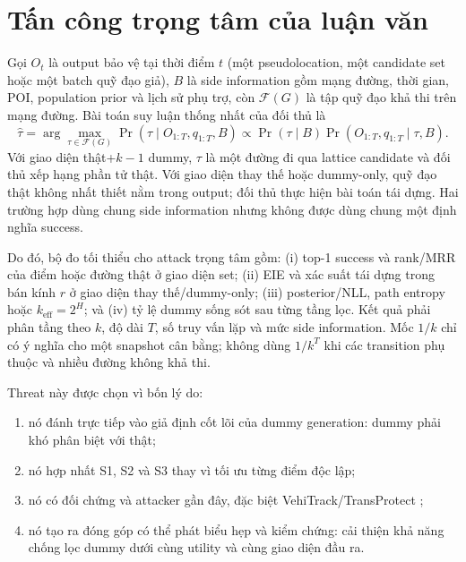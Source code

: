 \documentclass[12pt,a4paper,oneside]{report}
\begin{document}
\section{Tấn công trọng tâm của luận văn}

\begin{center}
\end{center}

Gọi $O_t$ là output bảo vệ tại thời điểm $t$ (một pseudolocation, một candidate set hoặc một batch quỹ đạo giả), $B$ là side information gồm mạng đường, thời gian, POI, population prior và lịch sử phụ trợ, còn $\mathcal F(G)$ là tập quỹ đạo khả thi trên mạng đường. Bài toán suy luận thống nhất của đối thủ là
\[
\widehat{\tau}
=\arg\max_{\tau\in\mathcal F(G)}
\Pr(\tau\mid O_{1:T},q_{1:T},B)
\propto
\Pr(\tau\mid B)\Pr(O_{1:T},q_{1:T}\mid\tau,B).
\]
Với giao diện thật+$k-1$ dummy, $\tau$ là một đường đi qua lattice candidate và đối thủ xếp hạng phần tử thật. Với giao diện thay thế hoặc dummy-only, quỹ đạo thật không nhất thiết nằm trong output; đối thủ thực hiện bài toán tái dựng. Hai trường hợp dùng chung side information nhưng không được dùng chung một định nghĩa success.

Do đó, bộ đo tối thiểu cho attack trọng tâm gồm: (i) top-1 success và rank/MRR của điểm hoặc đường thật ở giao diện set; (ii) EIE và xác suất tái dựng trong bán kính $r$ ở giao diện thay thế/dummy-only; (iii) posterior/NLL, path entropy hoặc $k_{\mathrm{eff}}=2^H$; và (iv) tỷ lệ dummy sống sót sau từng tầng lọc. Kết quả phải phân tầng theo $k$, độ dài $T$, số truy vấn lặp và mức side information. Mốc $1/k$ chỉ có ý nghĩa cho một snapshot cân bằng; không dùng $1/k^T$ khi các transition phụ thuộc và nhiều đường không khả thi.

Threat này được chọn vì bốn lý do:

\begin{enumerate}
  \item nó đánh trực tiếp vào giả định cốt lõi của dummy generation: dummy phải khó phân biệt với thật;
  \item nó hợp nhất S1, S2 và S3 thay vì tối ưu từng điểm độc lập;
  \item nó có đối chứng và attacker gần đây, đặc biệt VehiTrack/TransProtect \citep{yadav2024transprotect};
  \item nó tạo ra đóng góp có thể phát biểu hẹp và kiểm chứng: cải thiện khả năng chống lọc dummy dưới cùng utility và cùng giao diện đầu ra.
\end{enumerate}
\end{document}
